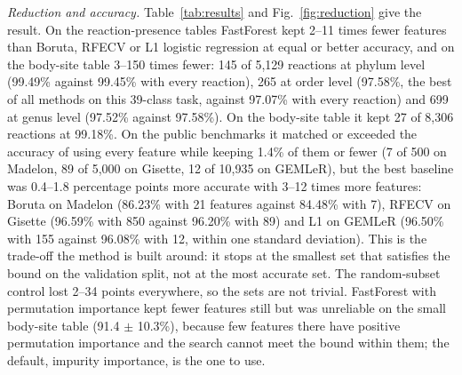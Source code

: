 \documentclass[11pt,a4paper]{article}
\begin{document}
\emph{Reduction and accuracy.} Table~\ref{tab:results} and Fig.~\ref{fig:reduction} give the result. On the reaction-presence tables FastForest kept 2--11 times fewer features than Boruta, RFECV or L1 logistic regression at equal or better accuracy, and on the body-site table 3--150 times fewer: 145 of 5,129 reactions at phylum level (99.49\% against 99.45\% with every reaction), 265 at order level (97.58\%, the best of all methods on this 39-class task, against 97.07\% with every reaction) and 699 at genus level (97.52\% against 97.58\%). On the body-site table it kept 27 of 8,306 reactions at 99.18\%. On the public benchmarks it matched or exceeded the accuracy of using every feature while keeping 1.4\% of them or fewer (7 of 500 on Madelon, 89 of 5,000 on Gisette, 12 of 10,935 on GEMLeR), but the best baseline was 0.4--1.8 percentage points more accurate with 3--12 times more features: Boruta on Madelon (86.23\% with 21 features against 84.48\% with 7), RFECV on Gisette (96.59\% with 850 against 96.20\% with 89) and L1 on GEMLeR (96.50\% with 155 against 96.08\% with 12, within one standard deviation). This is the trade-off the method is built around: it stops at the smallest set that satisfies the bound on the validation split, not at the most accurate set. The random-subset control lost 2--34 points everywhere, so the sets are not trivial. FastForest with permutation importance kept fewer features still but was unreliable on the small body-site table (91.4 $\pm$ 10.3\%), because few features there have positive permutation importance and the search cannot meet the bound within them; the default, impurity importance, is the one to use.
\end{document}

